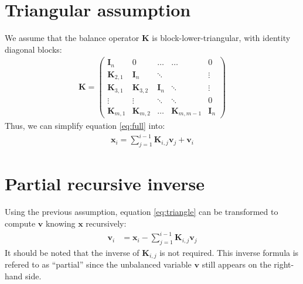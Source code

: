 \documentclass[12pt]{article}
\begin{document}
\section{Triangular assumption}
We assume that the balance operator $\mathbf{K}$ is block-lower-triangular, with identity diagonal blocks:
\begin{align}
\mathbf{K} = \left(\begin{array}{ccccc}
\mathbf{I}_n & 0 & \dots & \dots & 0 \\
\mathbf{K}_{2,1} & \mathbf{I}_n & \ddots & & \vdots \\
\mathbf{K}_{3,1} & \mathbf{K}_{3,2} & \mathbf{I}_n & \ddots & \vdots \\
\vdots & \vdots & \ddots & \ddots & 0 \\
\mathbf{K}_{m,1} & \mathbf{K}_{m,2} & \dots & \mathbf{K}_{m,m-1} & \mathbf{I}_n
\end{array} \right) 
\end{align}
Thus, we can simplify equation \eqref{eq:full} into:
\begin{align}
\label{eq:triangle}
\mathbf{x}_i = \sum_{j=1}^{i-1} \mathbf{K}_{i,j} \mathbf{v}_j + \mathbf{v}_i
\end{align}

\section{Partial recursive inverse}
Using the previous assumption, equation \eqref{eq:triangle} can be transformed to compute $\mathbf{v}$ knowing $\mathbf{x}$ recursively:
\begin{align}
\label{eq:partial_inverse}
\mathbf{v}_i & = \mathbf{x}_i - \sum_{j=1}^{i-1} \mathbf{K}_{i,j} \mathbf{v}_j
\end{align}
It should be noted that the inverse of $\mathbf{K}_{i,j}$ is not required. This inverse formula is refered to as ``partial'' since the unbalanced variable $\mathbf{v}$ still appears on the right-hand side.
\end{document}
